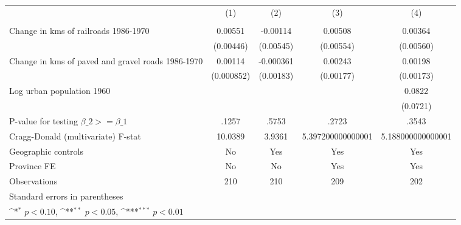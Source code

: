 {
\def\sym#1{\ifmmode^{#1}\else\(^{#1}\)\fi}
\begin{tabular}{l*{4}{c}}
\hline\hline
                &\multicolumn{1}{c}{(1)}&\multicolumn{1}{c}{(2)}&\multicolumn{1}{c}{(3)}&\multicolumn{1}{c}{(4)}\\
                &\multicolumn{1}{c}{}&\multicolumn{1}{c}{}&\multicolumn{1}{c}{}&\multicolumn{1}{c}{}\\
\hline
Change in kms of railroads 1986-1970&  0.00551         & -0.00114         &  0.00508         &  0.00364         \\
                &(0.00446)         &(0.00545)         &(0.00554)         &(0.00560)         \\
[1em]
Change in kms of paved and gravel roads 1986-1970&  0.00114         &-0.000361         &  0.00243         &  0.00198         \\
                &(0.000852)         &(0.00183)         &(0.00177)         &(0.00173)         \\
[1em]
Log urban population 1960&                  &                  &                  &   0.0822         \\
                &                  &                  &                  & (0.0721)         \\
\hline
P-value for testing $\beta\_{2} >= \beta\_{1}$&    .1257         &    .5753         &    .2723         &    .3543         \\
Cragg-Donald (multivariate) F-stat&  10.0389         &   3.9361         &5.397200000000001         &5.188000000000001         \\
Geographic controls&       No         &      Yes         &      Yes         &      Yes         \\
Province FE     &       No         &       No         &      Yes         &      Yes         \\
Observations    &      210         &      210         &      209         &      202         \\
\hline\hline
\multicolumn{5}{l}{\footnotesize Standard errors in parentheses}\\
\multicolumn{5}{l}{\footnotesize \sym{*} \(p<0.10\), \sym{**} \(p<0.05\), \sym{***} \(p<0.01\)}\\
\end{tabular}
}
